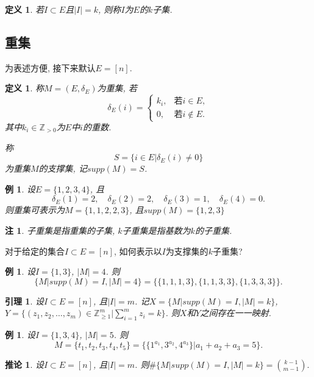 \documentclass[12pt,a4paper]{ctexbook} %
\newcounter{theorem}[section]
\newtheorem{definition}[theorem]{定义}
\newtheorem{lemma}[theorem]{引理}
\newtheorem{corollary}[theorem]{推论}
\newtheorem{example}[theorem]{例}
\newtheorem{remark}[theorem]{注}
\numberwithin{figure}{section}
\theoremstyle{problemstyle}
\numberwithin{equation}{section} %
\begin{document}
	\begin{definition}
		若$I\subset E$且$|I|=k$, 则称$I$为$E$的$k$子集.
	\end{definition}

\subsection{重集}
为表述方便, 接下来默认$E=[n]$. 

\begin{definition}
	称$M=(E,\delta_E)$为重集, 若
		$$\delta_E(i)=
	\begin{cases}
		k_i,& \mbox{若}i\in E,\\
		0,& \mbox{若}i\notin E.
	\end{cases}$$
	其中$k_i\in \mathbb{Z}_{>0}$为$E$中$i$的重数.
	
	称$$S=\{i\in E | \delta_E(i)\neq 0\}$$为重集$M$的支撑集, 记$supp(M)=S$. 
\end{definition}

	\begin{example}
		设$E=\{1,2,3,4\}$, 且
		$$\delta_E(1)=2,\quad \delta_E(2)=2, \quad \delta_E(3)=1, \quad \delta_E(4)=0.$$
		则重集可表示为$M=\{1,1,2,2,3\}$, 且$supp(M)=\{1,2,3\}$
	\end{example}
	\begin{remark}
		子重集是指重集的子集, $k$子重集是指基数为$k$的子重集. 
	\end{remark}
	对于给定的集合$I\subset E=[n]$, 如何表示以$I$为支撑集的$k$子重集?
	\begin{example}
		设$I=\{1,3\}$, $|M|=4$. 则
		$$\{M | supp(M)=I, |M|=4\}=\{\{1,1,1,3\}, \{1,1,3,3\}, \{1,3,3,3\}\}.$$
	\end{example}
	
	\begin{lemma}
		设$I\subset E=[n]$, 且$|I|=m$. 记$X=\{M | supp(M)=I, |M|=k\}$, $Y=\{(z_1,z_2,\dots,z_m)\in \mathbb{Z}^m_{\geq 1} | \sum_{i=1}^mz_i=k\}$. 则$X$和$Y$之间存在一一映射. 
	\end{lemma}
	
	\begin{example}
		设$I=\{1,3,4\}$, $|M|=5$. 则
		$$M=\{t_1,t_2,t_3,t_4,t_5\}=\{\{1^{a_1},3^{a_2},4^{a_3}\} | a_1+a_2+a_3=5\}.$$ 
	\end{example}
	
	\begin{corollary}
		设$I\subset E=[n]$, 且$|I|=m$. 则$\# \{M | supp(M)=I, |M|=k\}=\binom{k-1}{m-1}.$
	\end{corollary}
	
\end{document}
